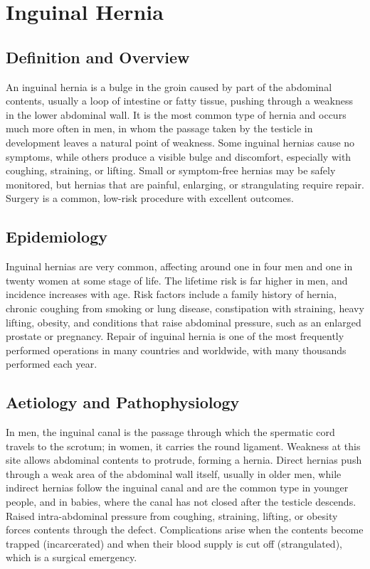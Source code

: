 \chapter{Inguinal Hernia}

\section*{Definition and Overview}
An inguinal hernia is a bulge in the groin caused by part of the abdominal contents, usually a loop of intestine or fatty tissue, pushing through a weakness in the lower abdominal wall. It is the most common type of hernia and occurs much more often in men, in whom the passage taken by the testicle in development leaves a natural point of weakness. Some inguinal hernias cause no symptoms, while others produce a visible bulge and discomfort, especially with coughing, straining, or lifting. Small or symptom-free hernias may be safely monitored, but hernias that are painful, enlarging, or strangulating require repair. Surgery is a common, low-risk procedure with excellent outcomes.

\section*{Epidemiology}
Inguinal hernias are very common, affecting around one in four men and one in twenty women at some stage of life. The lifetime risk is far higher in men, and incidence increases with age. Risk factors include a family history of hernia, chronic coughing from smoking or lung disease, constipation with straining, heavy lifting, obesity, and conditions that raise abdominal pressure, such as an enlarged prostate or pregnancy. Repair of inguinal hernia is one of the most frequently performed operations in many countries and worldwide, with many thousands performed each year.

\section*{Aetiology and Pathophysiology}
In men, the inguinal canal is the passage through which the spermatic cord travels to the scrotum; in women, it carries the round ligament. Weakness at this site allows abdominal contents to protrude, forming a hernia. Direct hernias push through a weak area of the abdominal wall itself, usually in older men, while indirect hernias follow the inguinal canal and are the common type in younger people, and in babies, where the canal has not closed after the testicle descends. Raised intra-abdominal pressure from coughing, straining, lifting, or obesity forces contents through the defect. Complications arise when the contents become trapped (incarcerated) and when their blood supply is cut off (strangulated), which is a surgical emergency.

